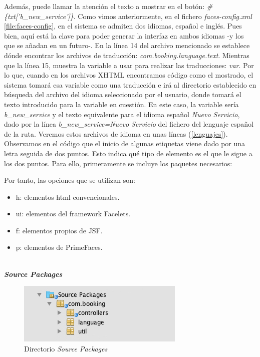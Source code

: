 Además, puede llamar la atención el texto a mostrar en el botón: \textit{#\{txt['b\_new\_service']\}}. Como vimos anteriormente, en el fichero \textit{faces-config.xml} \ref{file:faces-config}, en el sistema se admiten dos idiomas, español e inglés. Pues bien, aquí está la clave para poder generar la interfaz en ambos idiomas -y los que se añadan en un futuro-. En la línea 14 del archivo mencionado se establece dónde encontrar los archivos de traducción: \textit{com.booking.language.text}. Mientras que la línea 15, muestra la variable a usar para realizar las traducciones: \textit{var}. Por lo que, cuando en los archivos XHTML encontramos código como el mostrado, el sistema tomará esa variable como una traducción e irá al directorio establecido en búsqueda del archivo del idioma seleccionado por el usuario, donde tomará el texto introducido para la variable en cuestión. En este caso, la variable sería \textit{b\_new\_service} y el texto equivalente para el idioma español \textit{Nuevo Servicio}, dado por la línea \textit{b\_new\_service=Nuevo Servicio} del fichero del lenguaje español de la ruta. Veremos estos archivos de idioma en unas líneas (\ref{lenguajes}).\\

Observamos en el código que el inicio de algunas etiquetas viene dado por una letra seguida de dos puntos. Esto indica qué tipo de elemento es el que le sigue a los dos puntos. Para ello, primeramente se incluye los paquetes necesarios: 



Por tanto, las opciones que se utilizan son: 

\begin{itemize}
\item h: elementos html convencionales.
\item ui: elementos del framework Facelets.
\item f: elementos propios de JSF.
\item p: elementos de PrimeFaces.
\end{itemize}
\\

\textbf{\textit{Source Packages}}
\\

\begin{figure}[H]
\centering
  \includegraphics[scale=.70]{img/ficheros/source-packages.jpg}
  \caption{Directorio \textit{Source Packages}}
  \label{fig:source-packages}
\end{figure}


